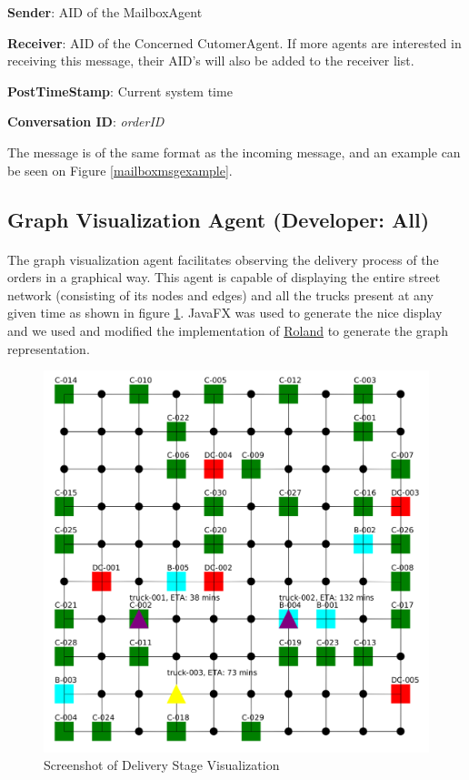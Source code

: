 \documentclass[11pt, a4paper]{article}
\begin{document}
\textbf{Sender}: AID of the MailboxAgent
	
\textbf{Receiver}: AID of the Concerned CutomerAgent. If more agents are interested in receiving this message, their AID's will also be added to the receiver list.
	
\textbf{PostTimeStamp}: Current system time
	
\textbf{Conversation ID}: \textit{orderID}
	
The message is of the same format as the incoming message, and an example can be seen on Figure \ref{mailboxmsgexample}.


\newpage
\subsection{Graph Visualization Agent (Developer: All)}\label{GraphVisualizationAgent}
\paragraph{}
The graph visualization agent facilitates observing the delivery process of the orders in a graphical way. This agent is capable of displaying the entire street network (consisting of its nodes and edges) and all the trucks present at any given time as shown in figure \ref{VisualizationScreenshot}. JavaFX was used to generate the nice display and we used and modified the implementation of \href{https://stackoverflow.com/a/30696075}{Roland} to generate the graph representation.

\begin{figure}[h!]
	\centering
	\includegraphics[width=\textwidth]{Visualization.png}
	\caption{Screenshot of Delivery Stage Visualization}
	\label{VisualizationScreenshot}
\end{figure}
\end{document}
